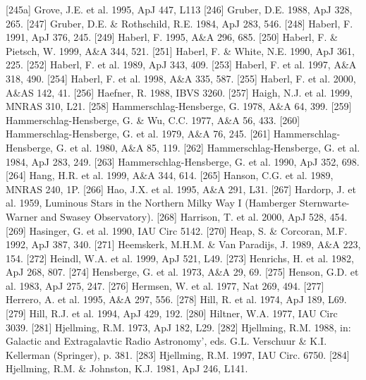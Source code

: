 \documentclass{aa}
\begin{document}
\begin{thebibliography}{}
\bibitem[]{}[245a] Grove, J.E. et al. 1995, ApJ 447, L113
\bibitem[]{}[246] Gruber, D.E. 1988, ApJ 328, 265.
\bibitem[]{}[247] Gruber, D.E. \& Rothschild, R.E. 1984, ApJ 283, 546.
\bibitem[]{}[248] Haberl, F. 1991, ApJ 376, 245.
\bibitem[]{}[249] Haberl, F. 1995, A\&A 296, 685.
\bibitem[]{}[250] Haberl, F. \& Pietsch, W. 1999, A\&A 344, 521.                                           
\bibitem[]{}[251] Haberl, F. \& White, N.E. 1990, ApJ 361, 225.
\bibitem[]{}[252] Haberl, F. et al. 1989, ApJ 343, 409.
\bibitem[]{}[253] Haberl, F. et al. 1997, A\&A 318, 490.  
\bibitem[]{}[254] Haberl, F. et al. 1998, A\&A 335, 587.
\bibitem[]{}[255] Haberl, F. et al. 2000, A\&AS 142, 41.
\bibitem[]{}[256] Haefner, R. 1988, IBVS 3260.
\bibitem[]{}[257] Haigh, N.J. et al. 1999, MNRAS 310, L21.
\bibitem[]{}[258] Hammerschlag-Hensberge, G. 1978, A\&A 64, 399.
\bibitem[]{}[259] Hammerschlag-Hensberge, G. \& Wu, C.C. 1977, A\&A 56, 433.
\bibitem[]{}[260] Hammerschlag-Hensberge, G. et al. 1979, A\&A 76, 245.
\bibitem[]{}[261] Hammerschlag-Hensberge, G. et al. 1980, A\&A 85, 119.
\bibitem[]{}[262] Hammerschlag-Hensberge, G. et al. 1984, ApJ 283, 249.
\bibitem[]{}[263] Hammerschlag-Hensberge, G. et al. 1990, ApJ 352, 698.
\bibitem[]{}[264] Hang, H.R. et al. 1999, A\&A 344, 614. 
\bibitem[]{}[265] Hanson, C.G. et al. 1989, MNRAS 240, 1P.
\bibitem[]{}[266] Hao, J.X. et al. 1995, A\&A 291, L31.
\bibitem[]{}[267] Hardorp, J. et al. 1959, Luminous Stars in the Northern Milky Way I 
                    (Hamberger Sternwarte- Warner and Swasey Observatory).
\bibitem[]{}[268] Harrison, T. et al. 2000, ApJ 528, 454.
\bibitem[]{}[269] Hasinger, G. et al. 1990, IAU Circ 5142.
\bibitem[]{}[270] Heap, S. \& Corcoran, M.F. 1992, ApJ 387, 340.
\bibitem[]{}[271] Heemskerk, M.H.M. \& Van Paradijs, J. 1989, A\&A 223, 154.
\bibitem[]{}[272] Heindl, W.A. et al. 1999, ApJ 521, L49.
\bibitem[]{}[273] Henrichs, H. et al. 1982, ApJ 268, 807.
\bibitem[]{}[274] Hensberge, G. et al. 1973, A\&A 29, 69.
\bibitem[]{}[275] Henson, G.D. et al. 1983, ApJ 275, 247.
\bibitem[]{}[276] Hermsen, W. et al. 1977, Nat 269, 494.
\bibitem[]{}[277] Herrero, A. et al. 1995, A\&A 297, 556.
\bibitem[]{}[278] Hill, R. et al. 1974, ApJ 189, L69.
\bibitem[]{}[279] Hill, R.J. et al. 1994, ApJ 429, 192.
\bibitem[]{}[280] Hiltner, W.A. 1977, IAU Circ 3039.
\bibitem[]{}[281] Hjellming, R.M. 1973, ApJ 182, L29.
\bibitem[]{}[282] Hjellming, R.M. 1988, in: Galactic and Extragalavtic Radio Astronomy', 
            eds. G.L. Verschuur \& K.I. Kellerman (Springer), p. 381.
\bibitem[]{}[283] Hjellming, R.M. 1997, IAU Circ. 6750.
\bibitem[]{}[284] Hjellming, R.M. \& Johnston, K.J. 1981, ApJ 246, L141.

\end{thebibliography}
\end{document}
